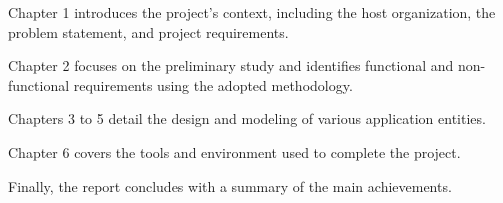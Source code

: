 \documentclass[12pt,a4paper,table]{report}
\begin{document}
Chapter 1 introduces the project's context, including the host organization, the problem statement, and project requirements.

Chapter 2 focuses on the preliminary study and identifies functional and non-functional requirements using the adopted methodology.

Chapters 3 to 5 detail the design and modeling of various application entities.

Chapter 6 covers the tools and environment used to complete the project.

Finally, the report concludes with a summary of the main achievements.









\thispagestyle{empty}

\pagestyle{empty}

\cleardoublepage
\pagestyle{empty} %
\printbibliography[heading=bibintoc]
\thispagestyle{empty} %

\cleardoublepage
\pagestyle{empty} %

\thispagestyle{empty} %

\label{LastPage}




\end{document}
